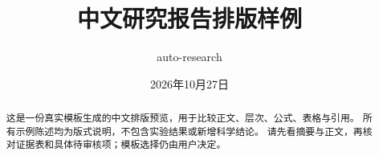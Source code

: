 \documentclass[lang=cn,chinesefont=nofont,bibend=bibtex,a4paper,10pt,device=normal]{elegantnote}
\title{中文研究报告排版样例}
\author{auto-research}
\date{2026年10月27日}
\begin{document}
\maketitle
\begin{abstract}
这是一份真实模板生成的中文排版预览，用于比较正文、层次、公式、表格与引用。
所有示例陈述均为版式说明，不包含实验结果或新增科学结论。
请先看摘要与正文，再核对证据表和具体待审核项；模板选择仍由用户决定。
\end{abstract}

\clearpage

\printbibliography[title={参考文献}]
\end{document}
